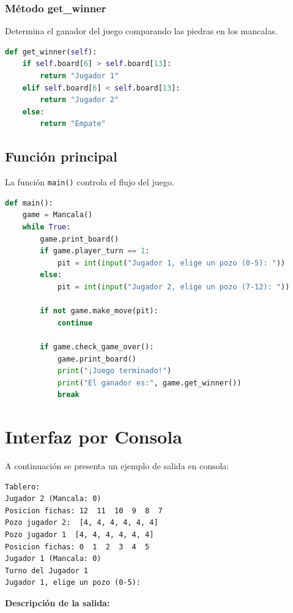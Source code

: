 \documentclass[12pt]{article}
\begin{document}
\subsubsection{Método get\_winner}
Determina el ganador del juego comparando las piedras en los mancalas.

\begin{lstlisting}[language=Python]
def get_winner(self):
    if self.board[6] > self.board[13]:
        return "Jugador 1"
    elif self.board[6] < self.board[13]:
        return "Jugador 2"
    else:
        return "Empate"
\end{lstlisting}

\subsection{Función principal}
La función \texttt{main()} controla el flujo del juego.

\begin{lstlisting}[language=Python]
def main():
    game = Mancala()
    while True:
        game.print_board()
        if game.player_turn == 1:
            pit = int(input("Jugador 1, elige un pozo (0-5): "))
        else:
            pit = int(input("Jugador 2, elige un pozo (7-12): "))

        if not game.make_move(pit):
            continue

        if game.check_game_over():
            game.print_board()
            print("¡Juego terminado!")
            print("El ganador es:", game.get_winner())
            break
\end{lstlisting}


\section{Interfaz por Consola}

A continuación se presenta un ejemplo de salida en consola:

\begin{lstlisting}
Tablero:
Jugador 2 (Mancala: 0)
Posicion fichas: 12  11  10  9  8  7
Pozo jugador 2:  [4, 4, 4, 4, 4, 4]
Pozo jugador 1  [4, 4, 4, 4, 4, 4]
Posicion fichas: 0  1  2  3  4  5
Jugador 1 (Mancala: 0)
Turno del Jugador 1
Jugador 1, elige un pozo (0-5):
\end{lstlisting}

\textbf{Descripción de la salida:}
\end{document}
